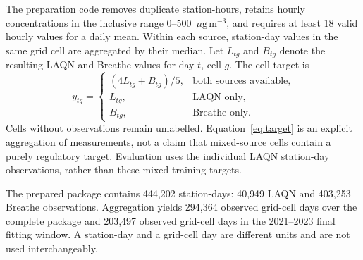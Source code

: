 \documentclass[11pt,a4paper]{article}
\newcommand{\ug}{\ensuremath{\mu\mathrm{g}\,\mathrm{m}^{-3}}}
\begin{document}
The preparation code removes duplicate station-hours, retains hourly
concentrations in the inclusive range 0--500~\ug, and requires at least
18 valid hourly values for a daily mean. Within each source, station-day values
in the same grid cell are aggregated by their median. Let $L_{tg}$ and
$B_{tg}$ denote the resulting LAQN and Breathe values for day $t$, cell $g$.
The cell target is
\begin{equation}
 y_{tg}=\begin{cases}
 (4L_{tg}+B_{tg})/5, & \text{both sources available},\\
 L_{tg}, & \text{LAQN only},\\
 B_{tg}, & \text{Breathe only}.
 \end{cases}
 \label{eq:target}
\end{equation}
Cells without observations remain unlabelled. Equation~\ref{eq:target} is an
explicit aggregation of measurements, not a claim that mixed-source cells
contain a purely regulatory target. Evaluation uses the individual LAQN
station-day observations, rather than these mixed training targets.

The prepared package contains 444,202 station-days: 40,949 LAQN and
403,253 Breathe observations. Aggregation yields 294,364 observed grid-cell
days over the complete package and 203,497 observed grid-cell days in the
2021--2023 final fitting window. A station-day and a grid-cell day are different
units and are not used interchangeably.
\end{document}
